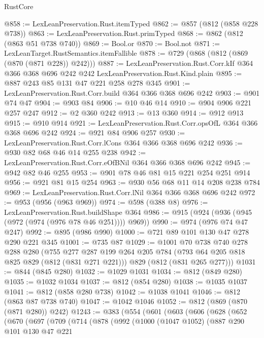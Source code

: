 \begin{lexlean}{RustCore}
\begin{coremodule}
@858 := LexLeanPreservation.Rust.itemTyped
@862 := @857 (@812 (@858 @228 @738))
@863 := LexLeanPreservation.Rust.primTyped
@868 := @862 (@812 (@863 @51 @738 @740))
@869 := Bool.or
@870 := Bool.not
@871 := LexLeanTarget.RustSemantics.itemFallible
@878 := @729 (@868 (@812 (@869 (@870 (@871 @228)) @242)))
@887 := LexLeanPreservation.Rust.Corr.kIf
    @364
    @366
    @368
    @696
    @242
    @242
    LexLeanPreservation.Rust.Kind.plain
@895 := @887 @243 @85 @131 @47 @221 @258 @278 @345
@901 := LexLeanPreservation.Rust.Corr.build @364 @366 @368 @696 @242
@903 := @901 @74 @47
@904 := @903 @84
@906 := @10 @46 @14
@910 := @904 @906 @221 @257 @247
@912 := @2 @360 @242
@913 := @13 @360
@914 := @912 @913
@915 := @910 @914
@921 := LexLeanPreservation.Rust.Corr.opsOfL @364 @366 @368 @696 @242
@924 := @921 @84 @906 @257
@930 := LexLeanPreservation.Rust.Corr.lCons @364 @366 @368 @696 @242
@936 := @930 @82 @68 @46 @14 @255 @238
@942 := LexLeanPreservation.Rust.Corr.eOfBNil @364 @366 @368 @696 @242
@945 := @942 @82 @46 @255
@953 := @901 @78 @46 @81 @15 @221 @254 @251 @914
@956 := @921 @81 @15 @254
@963 := @930 @56 @68 @11 @14 @208 @238 @784
@969 := LexLeanPreservation.Rust.Corr.lNil @364 @366 @368 @696 @242
@972 := @953 (@956 (@963 @969))
@974 := @598 (@388 @8)
@976 := LexLeanPreservation.Rust.buildShape @364
@986 := @915 (@924 (@936 (@945 (@972 (@974 (@976 @78 @46 @251)))) @969))
@990 := @974 (@976 @74 @47 @247)
@992 := @895 (@986 @990)
@1000 := @721 @89 @101 @130 @47 @278 @290 @221 @345
@1001 := @735 @87
@1029 := @1001
    @70
    @738
    @740
    @278
    @288
    @280
    (@755
      @277
      @287
      @199
      @264
      @205
      @784
      (@793 @64 @205 @818 @825 @829 (@812 (@831 @271 @221)))
      @829
      (@812 (@831 @265 @277)))
@1031 := @844 (@845 @280)
@1032 := @1029 @1031
@1034 := @812 (@849 @280)
@1035 := @1032 @1034
@1037 := @812 (@854 @280)
@1038 := @1035 @1037
@1041 := @812 (@858 @280 @738)
@1042 := @1038 @1041
@1046 := @812 (@863 @87 @738 @740)
@1047 := @1042 @1046
@1052 := @812 (@869 (@870 (@871 @280)) @242)
@1243 := @383
    (@554
      (@601
        (@603
          (@606
            (@628
              (@652
                (@670
                  (@697
                    (@709
                      (@714
                        (@878
                          (@992
                            (@1000
                              (@1047 @1052)
                              (@887
                                @290
                                @101
                                @130
                                @47
                                @221

\end{coremodule}
\end{lexlean}
